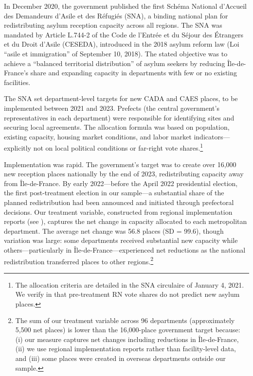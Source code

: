 \documentclass[12pt]{article}
\begin{document}
In December 2020, the government published the first Sch\'ema National d'Accueil des Demandeurs d'Asile et des R\'efugi\'es (SNA), a binding national plan for redistributing asylum reception capacity across all regions. The SNA was mandated by Article L.744-2 of the Code de l'Entr\'ee et du S\'ejour des \'Etrangers et du Droit d'Asile (CESEDA), introduced in the 2018 asylum reform law (Loi ``asile et immigration'' of September 10, 2018). The stated objective was to achieve a ``balanced territorial distribution'' of asylum seekers by reducing \^Ile-de-France's share and expanding capacity in departments with few or no existing facilities.

The SNA set department-level targets for new CADA and CAES places, to be implemented between 2021 and 2023. Prefects (the central government's representatives in each department) were responsible for identifying sites and securing local agreements. The allocation formula was based on population, existing capacity, housing market conditions, and labor market indicators---explicitly not on local political conditions or far-right vote shares.\footnote{The allocation criteria are detailed in the SNA circulaire of January 4, 2021. We verify in  that pre-treatment RN vote shares do not predict new asylum places.}

Implementation was rapid. The government's target was to create over 16,000 new reception places nationally by the end of 2023, redistributing capacity away from \^Ile-de-France. By early 2022---before the April 2022 presidential election, the first post-treatment election in our sample---a substantial share of the planned redistribution had been announced and initiated through prefectoral decisions. Our treatment variable, constructed from regional implementation reports (see ), captures the net change in capacity allocated to each metropolitan department. The average net change was 56.8 places (SD = 99.6), though variation was large: some departments received substantial new capacity while others---particularly in \^Ile-de-France---experienced net reductions as the national redistribution transferred places to other regions.\footnote{The sum of our treatment variable across 96 departments (approximately 5,500 net places) is lower than the 16,000-place government target because: (i) our measure captures net changes including reductions in \^Ile-de-France, (ii) we use regional implementation reports rather than facility-level data, and (iii) some places were created in overseas departments outside our sample.}
\end{document}
